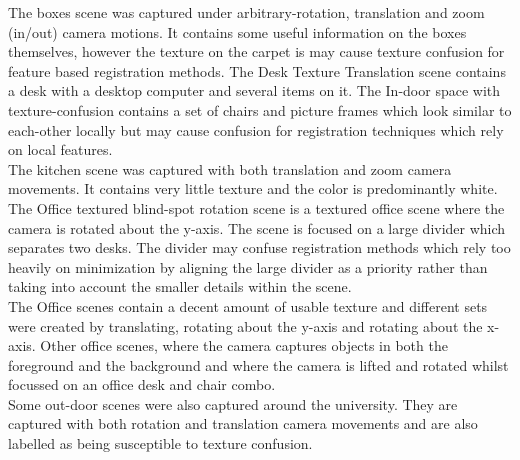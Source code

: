 The boxes scene was captured under arbitrary-rotation, translation and zoom (in/out) camera motions. It contains some useful information on the boxes themselves, however the texture on the carpet is may cause texture confusion for feature based registration methods. The Desk Texture Translation scene contains a desk with a desktop computer and several items on it. The In-door space with texture-confusion contains a set of chairs and picture frames which look similar to each-other locally but may cause confusion for registration techniques which rely on local features.  \\

The kitchen scene was captured with both translation and zoom camera movements. It contains very little texture and the color is predominantly white. The Office textured blind-spot rotation scene is a textured office scene where the camera is rotated about the y-axis. The scene is focused on a large divider which separates two desks. The divider may confuse registration methods which rely too heavily on minimization by aligning the large divider as a priority rather than taking into account the smaller details within the scene. \\

The Office scenes contain a decent amount of usable texture and different sets were created by translating, rotating about the y-axis and rotating about the x-axis. Other office scenes, where the camera captures objects in both the foreground and the background and where the camera is lifted and rotated whilst focussed on an office desk and chair combo. \\

Some out-door scenes were also captured around the university. They are captured with both rotation and translation camera movements and are also labelled as being susceptible to texture confusion.